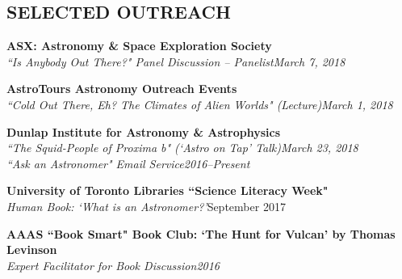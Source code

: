 \documentclass[10pt]{res} %
\begin{document}
\begin{resume}
\section{SELECTED OUTREACH}

\textbf{ASX: Astronomy \& Space Exploration Society}\\
{\sl ``Is Anybody Out There?" Panel Discussion -- Panelist}\hfill{\sl March 7, 2018}

\textbf{AstroTours Astronomy Outreach Events}\\
{\sl ``Cold Out There, Eh? The Climates of Alien Worlds" (Lecture)}\hfill{\sl March 1, 2018}%

\textbf{Dunlap Institute for Astronomy \& Astrophysics}\\
{\sl ``The Squid-People of Proxima b" (`Astro on Tap' Talk)}\hfill{\sl March 23, 2018}\\
{\sl ``Ask an Astronomer" Email Service}\hfill{\sl 2016--Present}%

\textbf{University of Toronto Libraries ``Science Literacy Week"}\\
{\sl Human Book: `What is an Astronomer?'}\hfill{September 2017}

\textbf{AAAS ``Book Smart" Book Club: `The Hunt for Vulcan' by Thomas Levinson}\\
{\sl Expert Facilitator for Book Discussion}\hfill{\sl 2016}


\end{resume}
\end{document}
